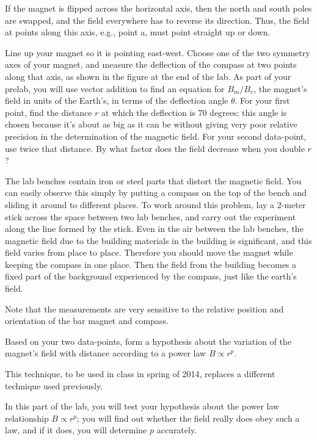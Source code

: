 If the magnet is flipped across the horizontal axis, then
the north and south poles are swapped, and the field
everywhere has to reverse its direction. Thus, the field at
points along this axis, e.g., point a, must point straight up or down.

Line up your magnet so it is pointing east-west. Choose one
of the two symmetry axes of your magnet, and measure the
deflection of the compass at two points along that axis,
as shown in the figure at the end of the lab.
As part of your prelab, you will use vector addition to find an equation
for $B_m/B_e$, the magnet's field in units of the Earth's, in terms
of the deflection angle $\theta$. For your first point, find the
distance $r$ at which the deflection is 70 degrees; this angle is chosen because
it's about as big as it can be without giving very poor relative precision 
in the determination of the magnetic field. For your second data-point,
use twice that distance. By what factor does the field decrease
when you double $r$?

The lab benches contain iron or steel parts that distort the magnetic field.
You can easily observe this simply by putting a compass on the top of the bench and sliding it around
to different places. To work around this problem, lay a 2-meter stick across the space between two
lab benches, and carry out the experiment along the line formed by the stick.
Even in the air between the lab benches, the magnetic field due to the building materials
in the building is significant, and this field varies from place to place.
Therefore you should move the magnet while keeping the compass in one place.
Then the field from the building becomes a fixed part of the background
experienced by the compass, just like the earth's field.

Note that the measurements are very sensitive to the
relative position and orientation of the bar magnet and
compass. 

Based on your two data-points, form a hypothesis about the variation
of the magnet's field with distance according to a power law $B\propto r^p$.


This technique, to be used in class in spring of 2014, replaces a different
technique used previously.

In this part of the lab, you will test your hypothesis about the power
law relationship $B\propto r^p$; you will find out whether the field really
does obey such a law, and if it does, you will determine $p$ accurately.

